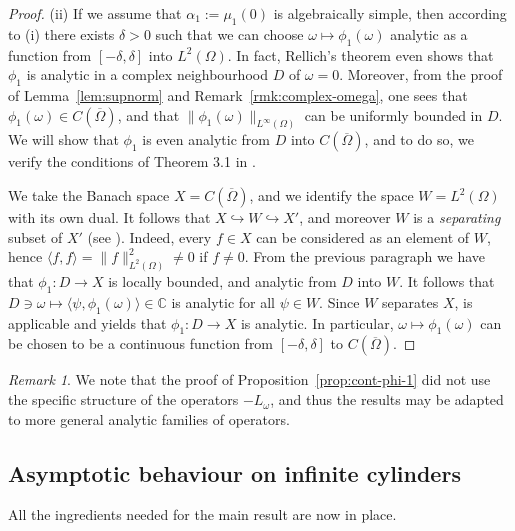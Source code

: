 \documentclass[a4paper, reqno,titlepage]{amsart}
\numberwithin{equation}{section}
\theoremstyle{plain}
\theoremstyle{definition}
\theoremstyle{remark}
\newtheorem{remark}[theorem]{Remark}
\newcommand{\CC}{\mathbb{C}}
\begin{document}
\begin{proof}
  (ii) If we assume that $\alpha_1 := \mu_1(0)$ is algebraically simple, then according to (i) there exists $\delta>0$ such that we can choose $\omega\mapsto\phi_1(\omega)$ analytic as a function from $[-\delta,\delta]$ into $L^2(\Omega)$. In fact, Rellich's theorem even shows that $\phi_1$ is analytic in a complex neighbourhood $D$ of $\omega = 0$. Moreover, from the proof of Lemma~\ref{lem:supnorm} and Remark~\ref{rmk:complex-omega}, one sees that $\phi_1(\omega)\in C(\overline\Omega)$, and that $\|\phi_1(\omega)\|_{L^\infty(\Omega)}$ can be uniformly bounded in $D$. We will show that $\phi_1$ is even analytic from $D$ into $C(\overline\Omega)$, and to do so, we verify the conditions of Theorem 3.1 in \cite{AN00}.

  We take the Banach space $X = C(\overline\Omega)$, and we identify the space $W = L^2(\Omega)$ with its own dual. It follows that $X \hookrightarrow W \hookrightarrow X'$, and moreover $W$ is a \emph{separating} subset of $X'$ (see \cite[p.\ 787]{AN00}). Indeed, every $f \in X$ can be considered as an element of $W$, hence $\langle f,f\rangle = \|f\|^2_{L^2(\Omega)} \ne 0$ if $f \ne 0$. From the previous paragraph we have that $\phi_1\colon D \to X$ is locally bounded, and analytic from $D$ into $W$. It follows that $D \ni \omega \mapsto \langle \psi, \phi_1(\omega)\rangle \in \CC$ is analytic for all $\psi \in W$. Since $W$ separates $X$, \cite[Theorem 3.1]{AN00} is applicable and yields that $\phi_1\colon D \to X$ is analytic. In particular, $\omega\mapsto\phi_1(\omega)$ can be chosen to be a continuous function from $[-\delta,\delta]$ to $C(\overline\Omega)$.
\end{proof}

\begin{remark}
  We note that the proof of Proposition~\ref{prop:cont-phi-1} did not use the specific structure of the operators $-L_\omega$, and thus the results may be adapted to more general analytic families of operators.
\end{remark}

\subsection{Asymptotic behaviour on infinite cylinders}
All the ingredients needed for the main result are now in place.
\end{document}
